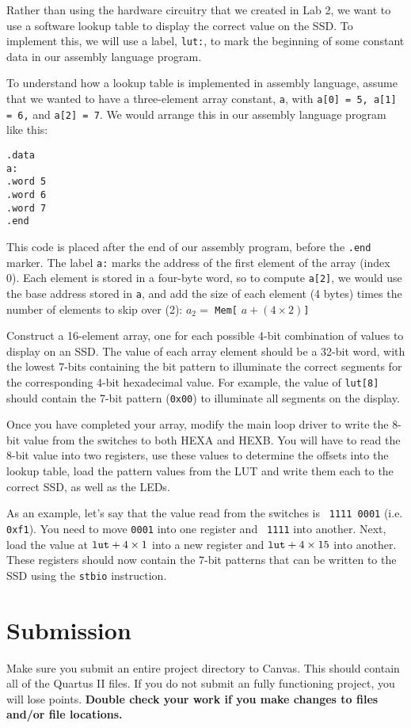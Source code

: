 \documentclass[10pt]{article}
\begin{document}
  Rather than using the hardware
circuitry that we created in Lab 2, we want to use a software lookup
table to display the correct value on the SSD. To implement this, we
will use a label, {\tt lut:}, to mark the beginning of some constant
data in our assembly language program.


To understand how a lookup table is implemented in assembly language,
assume that we wanted to have a three-element array constant, {\tt a},
with {\tt a[0] = 5, a[1] = 6,} and {\tt a[2] = 7}. We would arrange
this in our assembly language program like this:

\begin{verbatim}
.data
a:
.word 5
.word 6
.word 7
.end
\end{verbatim}

This code is placed after the end of our assembly program, before the
{\tt .end} marker. The label {\tt a:} marks the address of the first
element of the array (index 0). Each element is stored in a four-byte
word, so to compute {\tt a[2]}, we would use the base address stored
in {\tt a}, and add the size of each element (4 bytes) times the
number of elements to skip over (2): $ a_2 = $ {\tt Mem[} $a +
(4\times 2)${\tt ]}

Construct a 16-element array, one for each possible 4-bit combination
of values to display on an SSD. The value of each array element should
be a 32-bit word, with the lowest 7-bits containing the bit pattern to
illuminate the correct segments for the corresponding 4-bit
hexadecimal value. For example, the value of {\tt lut[8]} should
contain the 7-bit pattern ({\tt 0x00}) to illuminate all segments on
the display.

Once you have completed your array, modify the main loop driver to write the
8-bit value from the switches to both HEXA and HEXB. You will have to read the
8-bit value into two registers, use these values to determine the offsets into
the lookup table, load the pattern values from the LUT and write them each to
the correct SSD, as well as the LEDs.

As an example, let's say that the value read from the switches is {\tt
  1111 0001} (i.e. {\tt 0xf1}). You need to move {\tt 0001} into one register and {\tt
  1111} into another. Next, load the value at ${\tt lut} + 4 \times
1$ into a new register and ${\tt lut} + 4 \times 15$ into
another. These registers should now contain the 7-bit patterns that
can be written to the SSD using the {\tt stbio} instruction.

\section*{Submission}

Make sure you submit an entire project directory to Canvas. This
should contain all of the Quartus II files. If you do not submit an
fully functioning project, you will lose points. {\bf Double check
  your work if you make changes to files and/or file locations.}
\end{document}

